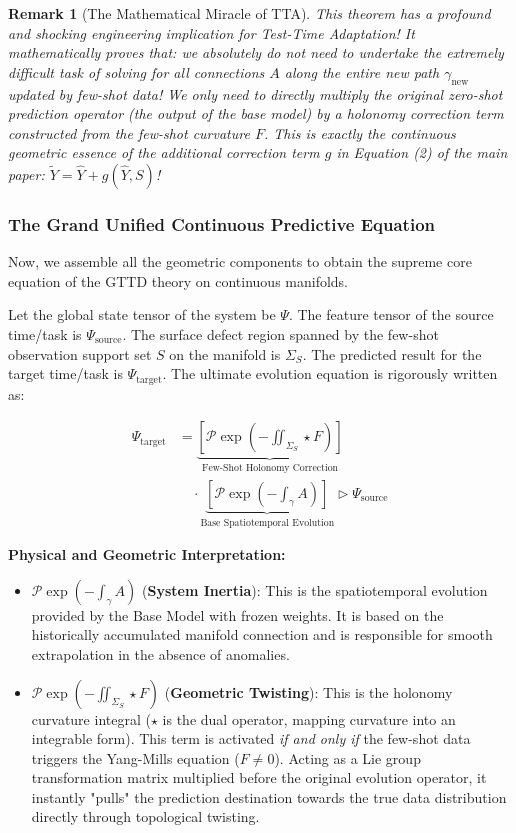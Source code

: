 \documentclass{article}
\newtheorem{remark}{Remark}[section]
\begin{document}
\begin{remark}[The Mathematical Miracle of TTA]
This theorem has a profound and shocking engineering implication for Test-Time Adaptation! It mathematically proves that: we absolutely do not need to undertake the extremely difficult task of solving for all connections $A$ along the entire new path $\gamma_{\text{new}}$ updated by few-shot data! We only need to directly multiply the original zero-shot prediction operator (the output of the base model) by a holonomy correction term constructed from the few-shot curvature $F$. This is exactly the continuous geometric essence of the additional correction term $g$ in Equation (2) of the main paper: $\tilde{Y} = \hat{Y} + g(\hat{Y}, S)$!
\end{remark}

\subsubsection{The Grand Unified Continuous Predictive Equation}

Now, we assemble all the geometric components to obtain the supreme core equation of the GTTD theory on continuous manifolds.

Let the global state tensor of the system be $\Psi$. The feature tensor of the source time/task is $\Psi_{\text{source}}$. The surface defect region spanned by the few-shot observation support set $S$ on the manifold is $\Sigma_S$. The predicted result for the target time/task is $\Psi_{\text{target}}$. The ultimate evolution equation is rigorously written as:

\begin{equation}
\begin{aligned}
\Psi_{\text{target}} &= \underbrace{ \left[ \mathcal{P}\exp \left( -\iint_{\Sigma_S} \star F \right) \right] }_{\text{Few-Shot Holonomy Correction}} \\
&\quad \cdot \underbrace{ \left[ \mathcal{P}\exp \left( -\int_\gamma A \right) \right] }_{\text{Base Spatiotemporal Evolution}} \triangleright \Psi_{\text{source}}
\end{aligned}
\end{equation}

\noindent\textbf{Physical and Geometric Interpretation:}
\begin{itemize}
    \item $\mathcal{P}\exp(-\int_\gamma A)$ (\textbf{System Inertia}): This is the spatiotemporal evolution provided by the Base Model with frozen weights. It is based on the historically accumulated manifold connection and is responsible for smooth extrapolation in the absence of anomalies.
    \item $\mathcal{P}\exp(-\iint_{\Sigma_S} \star F)$ (\textbf{Geometric Twisting}): This is the holonomy curvature integral ($\star$ is the dual operator, mapping curvature into an integrable form). This term is activated \textit{if and only if} the few-shot data triggers the Yang-Mills equation ($F \neq 0$). Acting as a Lie group transformation matrix multiplied before the original evolution operator, it instantly "pulls" the prediction destination towards the true data distribution directly through topological twisting.
\end{itemize}
\end{document}
